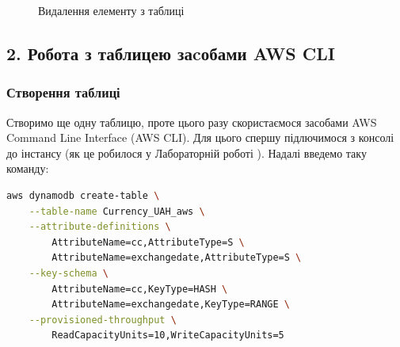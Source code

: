 \documentclass[a4paper,14pt]{extarticle} %
\begin{document}
\begin{figure}[H]
    \begin{minipage}[H]{1\linewidth}
    \end{minipage}
    \vfill
    \begin{minipage}[H]{1\linewidth}
        \vspace{0.5cm}
        \caption{Видалення елементу з таблиці}
        \label{fig:delete the element AWS MC}
    \end{minipage}
\end{figure}

\subsection*{2. Робота з таблицею заcобами AWS CLI}

\subsubsection*{Створення таблиці}

Створимо ще одну таблицю, проте цього разу скористаємося засобами AWS Command Line Interface (AWS CLI). Для 
цього спершу підлючимося з консолі до інстансу (як це робилося у Лабораторній роботі ). Надалі 
введемо таку команду: 

\begin{lstlisting}[language=bash]
    aws dynamodb create-table \
    --table-name Currency_UAH_aws \
    --attribute-definitions \
        AttributeName=cc,AttributeType=S \
        AttributeName=exchangedate,AttributeType=S \
    --key-schema \
        AttributeName=cc,KeyType=HASH \
        AttributeName=exchangedate,KeyType=RANGE \
    --provisioned-throughput \
        ReadCapacityUnits=10,WriteCapacityUnits=5
\end{lstlisting}
\end{document}
